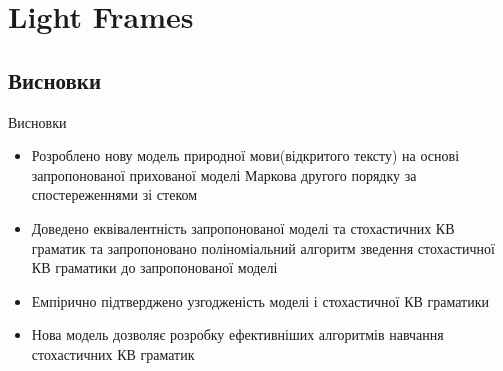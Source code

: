 \documentclass{beamer}
\begin{document}
  \section{Light Frames}
    \subsection{Висновки}
    \begin{frame}{Висновки}
      \begin{itemize}
        \item Розроблено нову модель природної мови(відкритого тексту) на основі запропонованої прихованої моделі Маркова другого порядку за спостереженнями зі стеком
        \item Доведено еквівалентність запропонованої моделі та стохастичних КВ граматик та запропоновано поліноміальний алгоритм зведення стохастичної КВ граматики до запропонованої моделі
        \item Емпірично підтверджено узгодженість моделі і стохастичної КВ граматики
        \item Нова модель дозволяє розробку ефективніших алгоритмів навчання стохастичних КВ граматик
      \end{itemize}
    \end{frame}
\end{document}
